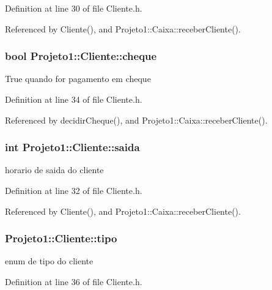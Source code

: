 Definition at line 30 of file Cliente.h.



Referenced by Cliente(), and Projeto1::Caixa::receberCliente().

\hypertarget{classProjeto1_1_1Cliente_ad54c6376c859c8cdb68887b3948e9841}{
\subsubsection[{cheque}]{\setlength{\rightskip}{0pt plus 5cm}bool {\bf Projeto1::Cliente::cheque}}}
\label{classProjeto1_1_1Cliente_ad54c6376c859c8cdb68887b3948e9841}
True quando for pagamento em cheque 

Definition at line 34 of file Cliente.h.



Referenced by decidirCheque(), and Projeto1::Caixa::receberCliente().

\hypertarget{classProjeto1_1_1Cliente_a868b7d7e3b824aed35511c433801824a}{
\subsubsection[{saida}]{\setlength{\rightskip}{0pt plus 5cm}int {\bf Projeto1::Cliente::saida}}}
\label{classProjeto1_1_1Cliente_a868b7d7e3b824aed35511c433801824a}
horario de saida do cliente 

Definition at line 32 of file Cliente.h.



Referenced by Cliente(), and Projeto1::Caixa::receberCliente().

\hypertarget{classProjeto1_1_1Cliente_af37da5fe48856223d53932cf61d4b3f7}{
\subsubsection[{tipo}]{ {\bf Projeto1::Cliente::tipo}}}
\label{classProjeto1_1_1Cliente_af37da5fe48856223d53932cf61d4b3f7}
enum de tipo do cliente 

Definition at line 36 of file Cliente.h.



